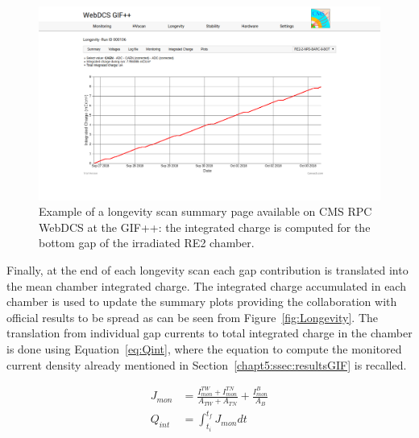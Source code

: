 	\begin{figure}[H]
        \centering
		\includegraphics[width = \linewidth]{fig/chapt5/Longevity-scan-Qint-vs-Time.png}
		\caption{\label{fig:DQM-Longevity-Qint} Example of a longevity scan summary page available on CMS RPC WebDCS at the GIF++: the integrated charge is computed for the bottom gap of the irradiated RE2 chamber.}
	\end{figure}
	
	Finally, at the end of each longevity scan each gap contribution is translated into the mean chamber integrated charge. The integrated charge accumulated in each chamber is used to update the summary plots providing the collaboration with official results to be spread as can be seen from Figure~\ref{fig:Longevity}. The translation from individual gap currents to total integrated charge in the chamber is done using Equation~\ref{eq:Qint}, where the equation to compute the monitored current density already mentioned in Section~\ref{chapt5:ssec:resultsGIF} is recalled.
	
	\begin{equation}
	\label{eq:Qint}
		\begin{aligned}
	J_{mon} &= \frac{I_{mon}^{TW}+I_{mon}^{TN}}{A_{TW}+A_{TN}} + \frac{I_{mon}^B}{A_B}\\
	Q_{int} &= \int_{t_i}^{t_f} J_{mon}dt
		\end{aligned}
	\end{equation}
	
